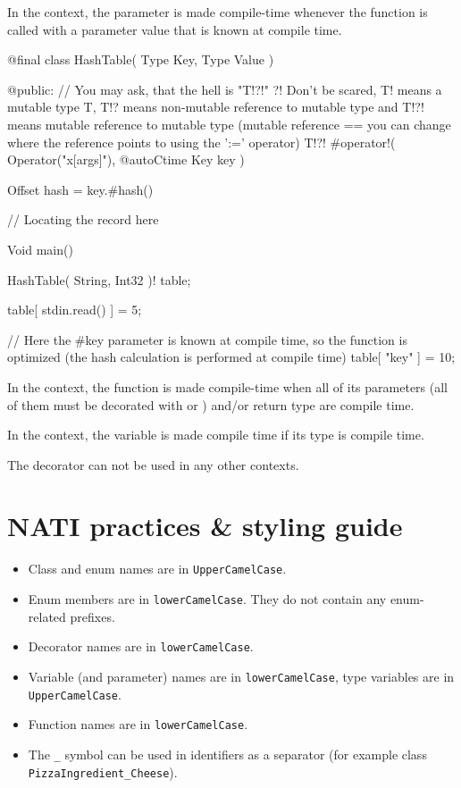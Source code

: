 In the  context, the parameter is made compile-time whenever the function is called with a parameter value that is known at compile time.
\begin{code}
@final class HashTable( Type Key, Type Value ) {

@public:
	// You may ask, that the hell is "T!?!" ?! Don't be scared, T! means a mutable type T, T!? means non-mutable reference to mutable type and T!?! means mutable reference to mutable type (mutable reference == you can change where the reference points to using the ':=' operator)
	T!?! #operator!( Operator("x[args]"), @autoCtime Key key ) {
		Offset hash = key.#hash() %
		
		// Locating the record here 
	}
	
}

Void main() {
	HashTable( String, Int32 )! table;
	
	table[ stdin.read() ] = 5;
	
	// Here the #key parameter is known at compile time, so the function is optimized (the hash calculation is performed at compile time)
	table[ "key" ] = 10;
}
\end{code}

In the  context, the function is made compile-time when all of its parameters (all of them must be decorated with  or ) and/or return type are compile time.

In the  context, the variable is made compile time if its type is compile time.

The decorator can not be used in any other contexts.

\chapter{NATI practices \& styling guide}

\begin{itemize}
	\item Class and enum names are in \verb|UpperCamelCase|.
	\item Enum members are in \verb|lowerCamelCase|. They do not contain any enum-related prefixes.
	\item Decorator names are in \verb|lowerCamelCase|.
	\item Variable (and parameter) names are in \verb|lowerCamelCase|, type variables are in \verb|UpperCamelCase|.
	\item Function names are in \verb|lowerCamelCase|.
	\item The \verb|_| symbol can be used in identifiers as a separator (for example class \verb|PizzaIngredient_Cheese|).
\end{itemize}

